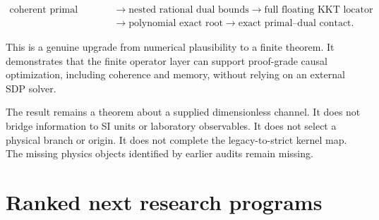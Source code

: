 \documentclass[11pt,a4paper,openany]{report}
\begin{document}
\[
\begin{aligned}
\text{coherent primal witness}
&\longrightarrow
\text{nested rational dual bounds}
\longrightarrow
\text{full floating KKT locator}\\
&\longrightarrow
\text{polynomial exact root}
\longrightarrow
\text{exact primal--dual contact}.
\end{aligned}
\]

This is a genuine upgrade from numerical plausibility to a finite theorem. It demonstrates that the finite operator layer can support proof-grade causal optimization, including coherence and memory, without relying on an external SDP solver.

The result remains a theorem about a supplied dimensionless channel. It does not bridge information to SI units or laboratory observables. It does not select a physical branch or origin. It does not complete the legacy-to-strict kernel map. The missing physics objects identified by earlier audits remain missing.

\chapter{Ranked next research programs}
\end{document}
